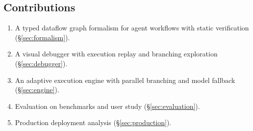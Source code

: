 \subsection{Contributions}

\begin{enumerate}[leftmargin=1.4em]
    \item A typed dataflow graph formalism for agent workflows with static verification (\S\ref{sec:formalism}).
    \item A visual debugger with execution replay and branching exploration (\S\ref{sec:debugger}).
    \item An adaptive execution engine with parallel branching and model fallback (\S\ref{sec:engine}).
    \item Evaluation on benchmarks and user study (\S\ref{sec:evaluation}).
    \item Production deployment analysis (\S\ref{sec:production}).
\end{enumerate}

